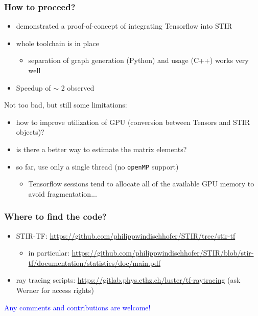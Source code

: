 \documentclass{beamer}
\begin{document}
\begin{frame}
  \frametitle{How to proceed?}
  \begin{itemize}
    \item demonstrated a proof-of-concept of integrating Tensorflow into STIR
    \item whole toolchain is in place
      \begin{itemize}
        \item separation of graph generation (Python) and usage (C++) works very well
      \end{itemize}
    \item Speedup of $\sim$ 2 observed
  \end{itemize}

  Not too bad, but still some limitations:
  \begin{itemize}
    \item how to improve utilization of GPU (conversion between Tensors and STIR objects)?
    \item is there a better way to estimate the matrix elements?
    \item so far, use only a single thread (no \texttt{openMP} support)
      \begin{itemize}
        \item Tensorflow sessions tend to allocate all of the available GPU memory to avoid fragmentation...
      \end{itemize}
  \end{itemize}

\end{frame}

\begin{frame}
  \frametitle{Where to find the code?}
  \begin{itemize}
    \item STIR-TF: \url{https://github.com/philippwindischhofer/STIR/tree/stir-tf}
      \begin{itemize}
        \item in particular: \url{https://github.com/philippwindischhofer/STIR/blob/stir-tf/documentation/statistics/doc/main.pdf}
      \end{itemize}
    \item ray tracing scripts: \url{https://gitlab.phys.ethz.ch/luster/tf-raytracing} (ask Werner for access rights)
  \end{itemize}

  \begin{center}
    \textcolor{blue}{Any comments and contributions are welcome!}
  \end{center}

\end{frame}
\end{document}
